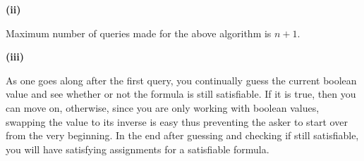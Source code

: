\documentclass[11pt]{article}
\renewcommand\part[1]{\vspace{.10in}\textbf{(#1)}\par}
\begin{document}
	\part{ii}
		Maximum number of queries made for the above algorithm is $n+1$.\par
		
	\part{iii}
		As one goes along after the first query, you continually guess the current boolean value and see whether or not the formula is still satisfiable. If it is true, then you can move on, otherwise, since you are only working with boolean values, swapping the value to its inverse is easy thus preventing the asker to start over from the very beginning. In the end after guessing and checking if still satisfiable, you will have satisfying assignments for a satisfiable formula.\par
	
\end{document}
